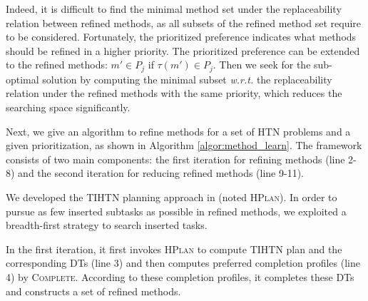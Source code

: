 \documentclass[letterpaper]{article} %
\newtheorem{definition}{Definition}
\newcommand{\Methods}{\mathcal{M}}
\newcommand{\prefer}{\leq_P}
\newcommand{\complete}{\tau}
\newcommand{\inverseComplete}{\complete}
\begin{document}

Indeed, it is difficult to find the minimal method set under the replaceability relation between refined methods, as all subsets of the refined method set require to be considered.
Fortunately, the prioritized preference indicates what methods should be refined in a higher priority.
The prioritized preference can be extended to the refined methods: $m'{\in} P_j$ if $\inverseComplete(m')\in P_j$.
Then we seek for the sub-optimal solution
by computing the minimal subset \emph{w.r.t.} the replaceability relation under the refined methods with the same priority, which reduces the searching space significantly.


Next, we give an algorithm to refine methods for a set of HTN problems and a given prioritization, as shown in Algorithm \ref{algor:method_learn}.
The framework consists of two main components: the first iteration for refining methods (line 2-8) and the second iteration for reducing refined methods (line 9-11).

We developed the TIHTN planning approach in \cite{alford2015tighttihtn} (noted \textsc{HPlan}).
In order to pursue as few inserted subtasks as possible in refined methods, we exploited a breadth-first strategy to search inserted tasks.

In the first iteration, it first invokes \textsc{HPlan} to compute TIHTN plan and the corresponding DTs (line 3) and then computes preferred completion profiles (line 4) by \textsc{Complete}.
According to these completion profiles, it completes these DTs and constructs a set of refined methods.
\end{document}
